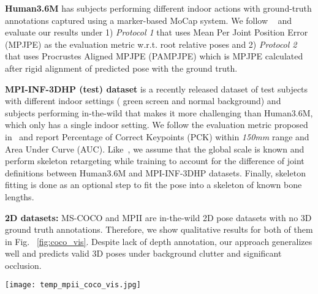 \documentclass[runningheads]{llncs}
\begin{document}
\indent \textbf{Human3.6M} has  subjects performing different indoor actions with ground-truth annotations captured using a marker-based MoCap system. We follow ~\cite{Tome_2017_CVPR} and evaluate our results under 1) \textit{Protocol 1} that uses Mean Per Joint Position Error (MPJPE) as the evaluation metric w.r.t. root relative poses and 2) \textit{Protocol 2} that uses Procrustes Aligned MPJPE (PAMPJPE) which is MPJPE calculated after rigid alignment of predicted pose with the ground truth.

\textbf{MPI-INF-3DHP (test) dataset} is a recently released dataset of  test subjects with different indoor settings ( green screen and normal background) and  subjects performing in-the-wild that makes it more challenging than Human3.6M, which only has a single indoor setting. We follow the evaluation metric proposed in~\cite{mono-3dhp2017} and report Percentage of Correct Keypoints (PCK) within \textit{150mm} range and Area Under Curve (AUC). Like~\cite{Zhou_2017_ICCV}, we assume that the global scale is known and perform skeleton retargeting while training to account for the difference of joint definitions between Human3.6M and MPI-INF-3DHP datasets. Finally, skeleton fitting is done as an optional step to fit the pose into a skeleton of known bone lengths.

\textbf{2D datasets:} MS-COCO and MPII are in-the-wild 2D pose datasets with no 3D ground truth annotations. Therefore, we show qualitative results for both of them in Fig. ~\ref{fig:coco_vis}. Despite lack of depth annotation, our approach generalizes well and predicts valid 3D poses under background clutter and significant occlusion. 

\begin{figure*}[t]
	\centering
	\texttt{[image: temp\_mpii\_coco\_vis.jpg]}
    \caption{(a) Comparison of our temporal model TP-Net with SAP-Net on a video. The highlighted poses demonstrate the ability of TP-Net to learn temporal correlations, and smoothen and refine pose estimates from SAP-Net. (b) Qualitative results of SAP-Net on some images from MPII and MS-COCO datasets, from multiple viewpoints.}
    \label{fig:coco_vis}
    \vspace{-2em}
\end{figure*}
\vspace{-1em}
\end{document}
